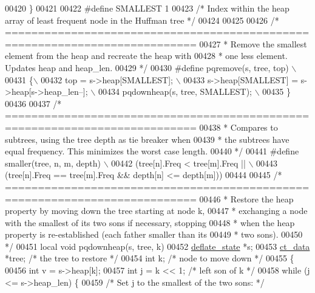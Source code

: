\begin{DoxyCode}
{{{{{{{{{00420 \}
00421 
00422 \textcolor{preprocessor}{#define SMALLEST 1}
00423 \textcolor{comment}{/* Index within the heap array of least frequent node in the Huffman tree */}
00424 
00425 
00426 \textcolor{comment}{/* ===========================================================================}
00427 \textcolor{comment}{ * Remove the smallest element from the heap and recreate the heap with}
00428 \textcolor{comment}{ * one less element. Updates heap and heap\_len.}
00429 \textcolor{comment}{ */}
00430 \textcolor{preprocessor}{#define pqremove(s, tree, top) \(\backslash\)}
00431 \textcolor{preprocessor}{\{\(\backslash\)}
00432 \textcolor{preprocessor}{    top = s->heap[SMALLEST]; \(\backslash\)}
00433 \textcolor{preprocessor}{    s->heap[SMALLEST] = s->heap[s->heap\_len--]; \(\backslash\)}
00434 \textcolor{preprocessor}{    pqdownheap(s, tree, SMALLEST); \(\backslash\)}
00435 \textcolor{preprocessor}{\}}
00436 
00437 \textcolor{comment}{/* ===========================================================================}
00438 \textcolor{comment}{ * Compares to subtrees, using the tree depth as tie breaker when}
00439 \textcolor{comment}{ * the subtrees have equal frequency. This minimizes the worst case length.}
00440 \textcolor{comment}{ */}
00441 \textcolor{preprocessor}{#define smaller(tree, n, m, depth) \(\backslash\)}
00442 \textcolor{preprocessor}{   (tree[n].Freq < tree[m].Freq || \(\backslash\)}
00443 \textcolor{preprocessor}{   (tree[n].Freq == tree[m].Freq && depth[n] <= depth[m]))}
00444 
00445 \textcolor{comment}{/* ===========================================================================}
00446 \textcolor{comment}{ * Restore the heap property by moving down the tree starting at node k,}
00447 \textcolor{comment}{ * exchanging a node with the smallest of its two sons if necessary, stopping}
00448 \textcolor{comment}{ * when the heap property is re-established (each father smaller than its}
00449 \textcolor{comment}{ * two sons).}
00450 \textcolor{comment}{ */}
00451 local \textcolor{keywordtype}{void} pqdownheap(s, tree, k)
00452     \hyperlink{structinternal__state}{deflate\_state} *s;
00453     \hyperlink{structct__data__s}{ct\_data} *tree;  \textcolor{comment}{/* the tree to restore */}
00454     \textcolor{keywordtype}{int} k;               \textcolor{comment}{/* node to move down */}
00455 \{
00456     \textcolor{keywordtype}{int} v = s->heap[k];
00457     \textcolor{keywordtype}{int} j = k << 1;  \textcolor{comment}{/* left son of k */}
00458     \textcolor{keywordflow}{while} (j <= s->heap\_len) \{
00459         \textcolor{comment}{/* Set j to the smallest of the two sons: */}
}}}}}}}}}
\end{DoxyCode}
